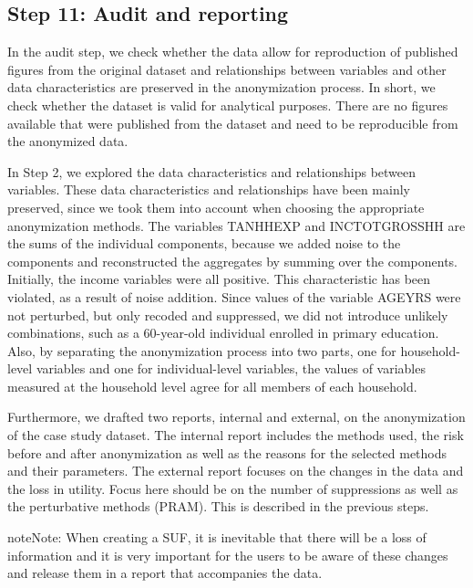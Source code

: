 \documentclass[letterpaper,10pt,english]{sphinxmanual}
\begin{document}
\subsection{Step 11: Audit and reporting}
\label{\detokenize{case_studies:step-11-audit-and-reporting}}
In the audit step, we check whether the data allow for reproduction of
published figures from the original dataset and relationships between
variables and other data characteristics are preserved in the
anonymization process. In short, we check whether the dataset is valid
for analytical purposes. There are no figures available that were
published from the dataset and need to be reproducible from the
anonymized data.

In Step 2, we explored the data characteristics and relationships
between variables. These data characteristics and relationships have
been mainly preserved, since we took them into account when choosing the
appropriate anonymization methods. The variables TANHHEXP and
INCTOTGROSSHH are the sums of the individual components, because we
added noise to the components and reconstructed the aggregates by
summing over the components. Initially, the income variables were all
positive. This characteristic has been violated, as a result of noise
addition. Since values of the variable AGEYRS were not perturbed, but
only recoded and suppressed, we did not introduce unlikely combinations,
such as a 60-year-old individual enrolled in primary education. Also, by
separating the anonymization process into two parts, one for
household-level variables and one for individual-level variables, the
values of variables measured at the household level agree for all
members of each household.

Furthermore, we drafted two reports, internal and external, on the
anonymization of the case study dataset. The internal report includes
the methods used, the risk before and after anonymization as well as the
reasons for the selected methods and their parameters. The external
report focuses on the changes in the data and the loss in utility. Focus
here should be on the number of suppressions as well as the perturbative
methods (PRAM). This is described in the previous steps.

\begin{sphinxadmonition}{note}{Note:}
When creating a SUF, it is inevitable that there will be a loss of
information and it is very important for the users to be aware of these
changes and release them in a report that accompanies the data.
\end{sphinxadmonition}
\end{document}
